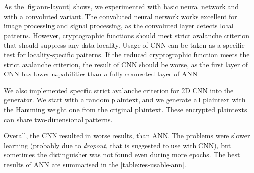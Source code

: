 \documentclass[
  print, %
  Table,   %
  nolof,     %
  nolot,     %
  11pt, %
  oneside  %
]{fithesis3}
\begin{document}
As the \cref{fig:ann-layout} shows, we experimented with basic neural network and with a convoluted variant. The convoluted neural network works excellent for image processing and signal processing, as the convoluted layer detects local patterns. However, cryptographic functions should meet strict avalanche criterion that should suppress any data locality. Usage of CNN can be taken as a specific test for locality-specific patterns. If the reduced cryptographic function meets the strict avalanche criterion, the result of CNN should be worse, as the first layer of CNN has lower capabilities than a fully connected layer of ANN.

We also implemented specific strict avalanche criterion for 2D CNN into the generator. We start with a random plaintext, and we generate all plaintext with the Hamming weight one from the original plaintext. These encrypted plaintexts can share two-dimensional patterns.

Overall, the CNN resulted in worse results, than ANN. The problems were slower learning (probably due to \textit{dropout}, that is suggested to use with CNN), but sometimes the distinguisher was not found even during more epochs. The best results of ANN are summarised in the \cref{table:res-usable-ann}.
\end{document}
